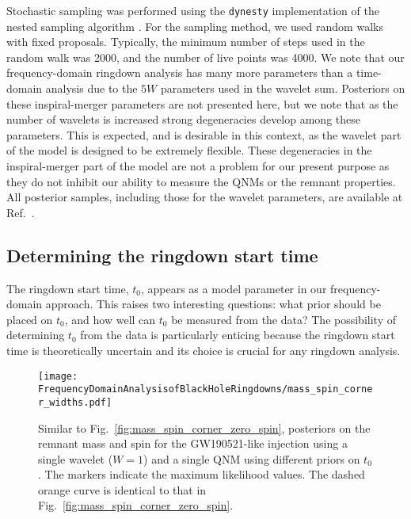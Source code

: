 Stochastic sampling was performed using the \texttt{dynesty} \cite{Speagle:2019ivv} implementation of the nested sampling algorithm \cite{doi:10.1063/1.1835238, Skilling:2006gxv}.
For the sampling method, we used random walks with fixed proposals.
Typically, the minimum number of steps used in the random walk was 2000, and the number of live points was 4000.
We note that our frequency-domain ringdown analysis has many more parameters than a time-domain analysis due to the $5W$ parameters used in the wavelet sum.
Posteriors on these inspiral-merger parameters are not presented here, but we note that as the number of wavelets is increased strong degeneracies develop among these parameters.
This is expected, and is desirable in this context, as the wavelet part of the model is designed to be extremely flexible. 
These degeneracies in the inspiral-merger part of the model are not a problem for our present purpose as they do not inhibit our ability to measure the QNMs or the remnant properties. 
All posterior samples, including those for the wavelet parameters, are available at Ref.~\cite{finch_eliot_2021_5569759}.


\subsection{Determining the ringdown start time}\label{subsec:t0}

The ringdown start time, $t_0$, appears as a model parameter in our frequency-domain approach.
This raises two interesting questions: what prior should be placed on $t_0$, and how well can $t_0$ be measured from the data?
The possibility of determining $t_0$ from the data is particularly enticing because the ringdown start time is theoretically uncertain and its choice is crucial for any ringdown analysis.

\begin{figure}
    \centering
    \texttt{[image: FrequencyDomainAnalysisofBlackHoleRingdowns/mass\_spin\_corner\_widths.pdf]}
    \caption[Similar to Fig.~\ref{fig:mass_spin_corner_zero_spin}, posteriors on the remnant mass and spin for the GW190521-like injection using a single wavelet ($W=1$) and a single QNM using different priors on $t_0$]{ 
    Similar to Fig.~\ref{fig:mass_spin_corner_zero_spin}, posteriors on the remnant mass and spin for the GW190521-like injection using a single wavelet ($W=1$) and a single QNM using different priors on $t_0$.
    The markers indicate the maximum likelihood values.
    The dashed orange curve is identical to that in Fig.~\ref{fig:mass_spin_corner_zero_spin}.
    }
    \label{fig:start_time_prior}
\end{figure}

